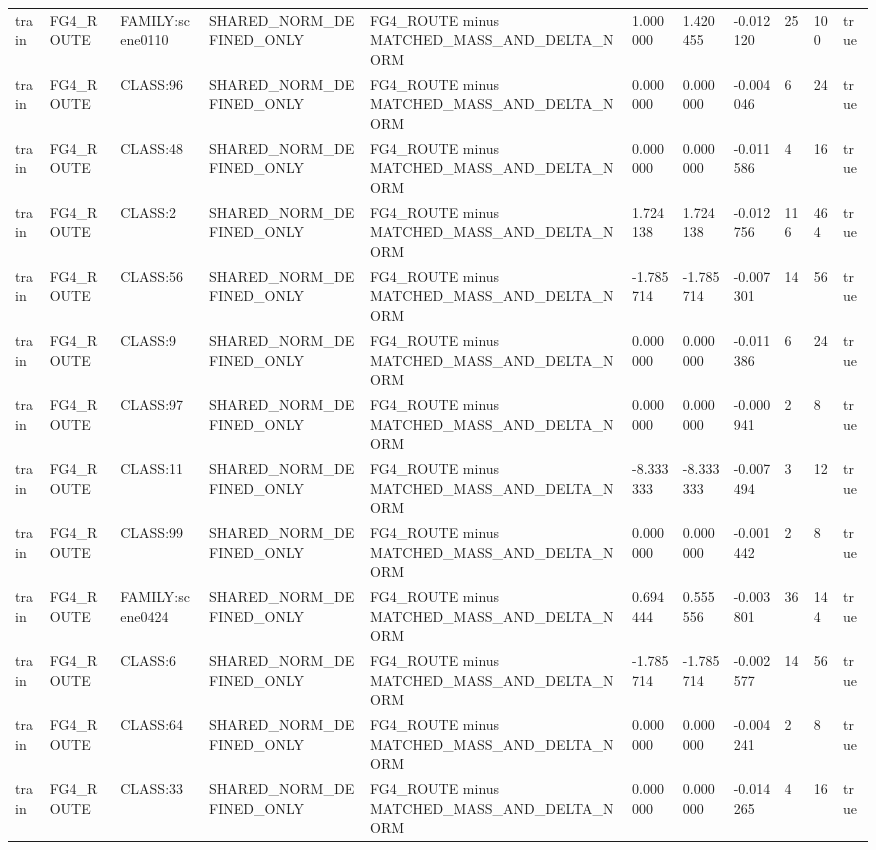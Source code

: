 \begin{tabular}{lllllllllll}
train & FG4\_ROUTE & FAMILY:scene0110 & SHARED\_NORM\_DEFINED\_ONLY & FG4\_ROUTE minus MATCHED\_MASS\_AND\_DELTA\_NORM & 1.000000 & 1.420455 & -0.012120 & 25 & 100 & true \\
train & FG4\_ROUTE & CLASS:96 & SHARED\_NORM\_DEFINED\_ONLY & FG4\_ROUTE minus MATCHED\_MASS\_AND\_DELTA\_NORM & 0.000000 & 0.000000 & -0.004046 & 6 & 24 & true \\
train & FG4\_ROUTE & CLASS:48 & SHARED\_NORM\_DEFINED\_ONLY & FG4\_ROUTE minus MATCHED\_MASS\_AND\_DELTA\_NORM & 0.000000 & 0.000000 & -0.011586 & 4 & 16 & true \\
train & FG4\_ROUTE & CLASS:2 & SHARED\_NORM\_DEFINED\_ONLY & FG4\_ROUTE minus MATCHED\_MASS\_AND\_DELTA\_NORM & 1.724138 & 1.724138 & -0.012756 & 116 & 464 & true \\
train & FG4\_ROUTE & CLASS:56 & SHARED\_NORM\_DEFINED\_ONLY & FG4\_ROUTE minus MATCHED\_MASS\_AND\_DELTA\_NORM & -1.785714 & -1.785714 & -0.007301 & 14 & 56 & true \\
train & FG4\_ROUTE & CLASS:9 & SHARED\_NORM\_DEFINED\_ONLY & FG4\_ROUTE minus MATCHED\_MASS\_AND\_DELTA\_NORM & 0.000000 & 0.000000 & -0.011386 & 6 & 24 & true \\
train & FG4\_ROUTE & CLASS:97 & SHARED\_NORM\_DEFINED\_ONLY & FG4\_ROUTE minus MATCHED\_MASS\_AND\_DELTA\_NORM & 0.000000 & 0.000000 & -0.000941 & 2 & 8 & true \\
train & FG4\_ROUTE & CLASS:11 & SHARED\_NORM\_DEFINED\_ONLY & FG4\_ROUTE minus MATCHED\_MASS\_AND\_DELTA\_NORM & -8.333333 & -8.333333 & -0.007494 & 3 & 12 & true \\
train & FG4\_ROUTE & CLASS:99 & SHARED\_NORM\_DEFINED\_ONLY & FG4\_ROUTE minus MATCHED\_MASS\_AND\_DELTA\_NORM & 0.000000 & 0.000000 & -0.001442 & 2 & 8 & true \\
train & FG4\_ROUTE & FAMILY:scene0424 & SHARED\_NORM\_DEFINED\_ONLY & FG4\_ROUTE minus MATCHED\_MASS\_AND\_DELTA\_NORM & 0.694444 & 0.555556 & -0.003801 & 36 & 144 & true \\
train & FG4\_ROUTE & CLASS:6 & SHARED\_NORM\_DEFINED\_ONLY & FG4\_ROUTE minus MATCHED\_MASS\_AND\_DELTA\_NORM & -1.785714 & -1.785714 & -0.002577 & 14 & 56 & true \\
train & FG4\_ROUTE & CLASS:64 & SHARED\_NORM\_DEFINED\_ONLY & FG4\_ROUTE minus MATCHED\_MASS\_AND\_DELTA\_NORM & 0.000000 & 0.000000 & -0.004241 & 2 & 8 & true \\
train & FG4\_ROUTE & CLASS:33 & SHARED\_NORM\_DEFINED\_ONLY & FG4\_ROUTE minus MATCHED\_MASS\_AND\_DELTA\_NORM & 0.000000 & 0.000000 & -0.014265 & 4 & 16 & true \\

\end{tabular}
